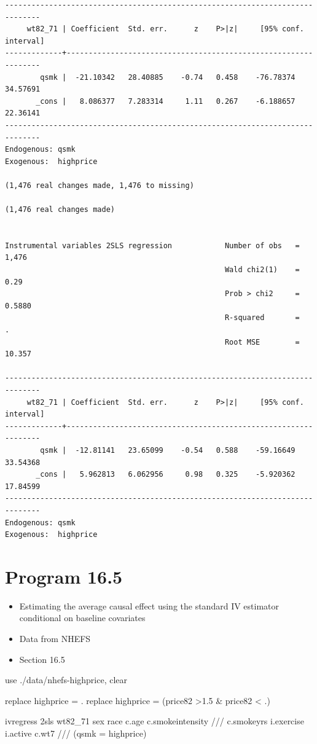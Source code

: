 \documentclass[
  10pt,
  a4paper,
]{book}
\newenvironment{Shaded}{\begin{snugshade}}{\end{snugshade}}
\newcommand{\CommentTok}[1]{\textcolor[rgb]{0.37,0.37,0.37}{#1}}
\newcommand{\KeywordTok}[1]{\textcolor[rgb]{0.00,0.46,0.62}{#1}}
\newcommand{\NormalTok}[1]{\textcolor[rgb]{0.00,0.46,0.62}{#1}}
\providecommand{\tightlist}{%
  \setlength{\itemsep}{0pt}\setlength{\parskip}{0pt}}
\begin{document}
\begin{verbatim}
------------------------------------------------------------------------------
     wt82_71 | Coefficient  Std. err.      z    P>|z|     [95% conf. interval]
-------------+----------------------------------------------------------------
        qsmk |  -21.10342   28.40885    -0.74   0.458    -76.78374    34.57691
       _cons |   8.086377   7.283314     1.11   0.267    -6.188657    22.36141
------------------------------------------------------------------------------
Endogenous: qsmk
Exogenous:  highprice

(1,476 real changes made, 1,476 to missing)

(1,476 real changes made)


Instrumental variables 2SLS regression            Number of obs   =      1,476
                                                  Wald chi2(1)    =       0.29
                                                  Prob > chi2     =     0.5880
                                                  R-squared       =          .
                                                  Root MSE        =     10.357

------------------------------------------------------------------------------
     wt82_71 | Coefficient  Std. err.      z    P>|z|     [95% conf. interval]
-------------+----------------------------------------------------------------
        qsmk |  -12.81141   23.65099    -0.54   0.588    -59.16649    33.54368
       _cons |   5.962813   6.062956     0.98   0.325    -5.920362    17.84599
------------------------------------------------------------------------------
Endogenous: qsmk
Exogenous:  highprice
\end{verbatim}

\section{Program 16.5}\label{program-16.5-1}

\begin{itemize}
\tightlist
\item
  Estimating the average causal effect using the standard IV estimator conditional on baseline covariates
\item
  Data from NHEFS
\item
  Section 16.5
\end{itemize}

\begin{Shaded}
\begin{Highlighting}[]
\KeywordTok{use}\NormalTok{ ./}\KeywordTok{data}\NormalTok{/nhefs{-}highprice, }\KeywordTok{clear}

\KeywordTok{replace}\NormalTok{ highprice = .}
\KeywordTok{replace}\NormalTok{ highprice = (price82 \textgreater{}1.5 \& price82 \textless{} .)}

\NormalTok{ivregress 2sls wt82\_71 sex race c.age c.smokeintensity }\CommentTok{///}
\NormalTok{  c.smokeyrs i.exercise i.active c.wt7 }\CommentTok{///}
\NormalTok{  (qsmk = highprice)}
\end{Highlighting}
\end{Shaded}
\end{document}
